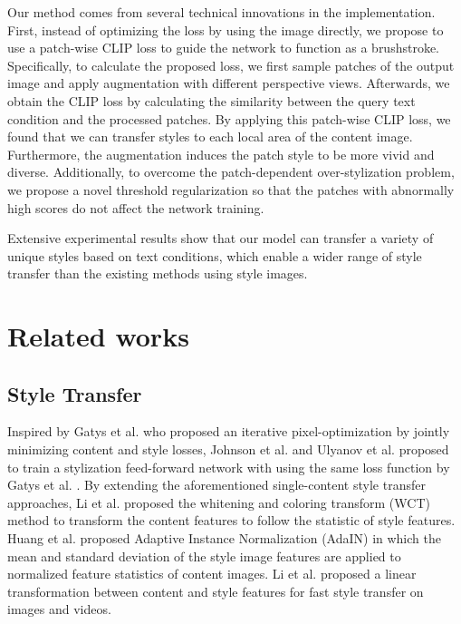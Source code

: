 \documentclass[10pt,twocolumn,letterpaper]{article}
\begin{document}
Our method comes from several technical innovations in the implementation.
First,  instead of optimizing the loss by using the image directly, we propose to use a patch-wise CLIP loss to guide the network to function as a brushstroke. 
Specifically, to calculate the proposed loss, we first sample patches of the output image and apply augmentation with different perspective views. 
Afterwards, we obtain the CLIP loss by calculating the similarity between the query text condition and the processed patches. By applying this patch-wise CLIP loss, 
we found that we can transfer styles to each local area of the content image. Furthermore, the augmentation induces the patch style to be more vivid and diverse.
Additionally, %
to overcome the patch-dependent over-stylization problem, %
we propose a novel threshold regularization so that the patches with abnormally high scores do not affect the network training.

Extensive experimental  results show that our model can transfer a variety of unique styles based on text conditions, which enable a wider range of style transfer than the existing methods using style images.



\section{Related works}
\subsection{Style Transfer}

Inspired by Gatys et al. \cite{gatys} who proposed an iterative pixel-optimization 
 by jointly minimizing content and style
losses,
 Johnson et al.\cite{johnson} and Ulyanov et al.\cite{ulyanov} proposed to train a stylization feed-forward network with using the same loss function by Gatys et al. \cite{gatys}.
By extending the aforementioned single-content style transfer approaches, %
Li et al.\cite{li1,li2} proposed the whitening and coloring transform (WCT) method to transform the content features to follow the statistic of style features.
Huang et al.\cite{adain} proposed Adaptive Instance Normalization (AdaIN) in which the mean and standard deviation of the style image features are applied to normalized feature statistics of content images. Li et al.\cite{li3} proposed a linear transformation between content and style features for fast style transfer on images and videos. 
\end{document}
